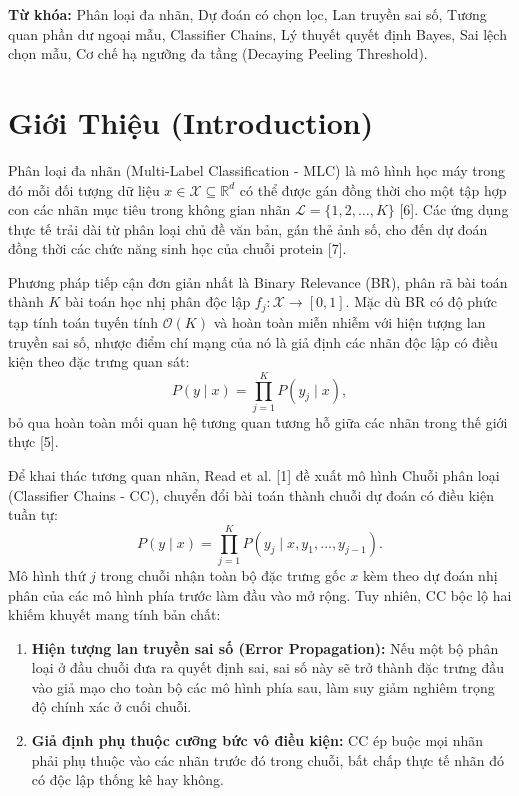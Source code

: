 \documentclass[10pt,a4paper,twoside]{article}
\begin{document}
\vspace{0.5em}
\noindent\textbf{Từ khóa:} Phân loại đa nhãn, Dự đoán có chọn lọc, Lan truyền sai số, Tương quan phần dư ngoại mẫu, Classifier Chains, Lý thuyết quyết định Bayes, Sai lệch chọn mẫu, Cơ chế hạ ngưỡng đa tầng (Decaying Peeling Threshold).

\section{Giới Thiệu (Introduction)}
Phân loại đa nhãn (Multi-Label Classification - MLC) là mô hình học máy trong đó mỗi đối tượng dữ liệu $x \in \mathcal{X} \subseteq \mathbb{R}^d$ có thể được gán đồng thời cho một tập hợp con các nhãn mục tiêu trong không gian nhãn $\mathcal{L} = \{1, 2, \dots, K\}$ [6]. Các ứng dụng thực tế trải dài từ phân loại chủ đề văn bản, gán thẻ ảnh số, cho đến dự đoán đồng thời các chức năng sinh học của chuỗi protein [7].

Phương pháp tiếp cận đơn giản nhất là Binary Relevance (BR), phân rã bài toán thành $K$ bài toán học nhị phân độc lập $f_j: \mathcal{X} \to [0, 1]$. Mặc dù BR có độ phức tạp tính toán tuyến tính $\mathcal{O}(K)$ và hoàn toàn miễn nhiễm với hiện tượng lan truyền sai số, nhược điểm chí mạng của nó là giả định các nhãn độc lập có điều kiện theo đặc trưng quan sát:
\begin{equation}
P(y \mid x) = \prod_{j=1}^K P(y_j \mid x),
\end{equation}
bỏ qua hoàn toàn mối quan hệ tương quan tương hỗ giữa các nhãn trong thế giới thực [5].

Để khai thác tương quan nhãn, Read et al. [1] đề xuất mô hình Chuỗi phân loại (Classifier Chains - CC), chuyển đổi bài toán thành chuỗi dự đoán có điều kiện tuần tự:
\begin{equation}
P(y \mid x) = \prod_{j=1}^K P(y_j \mid x, y_1, \dots, y_{j-1}).
\end{equation}
Mô hình thứ $j$ trong chuỗi nhận toàn bộ đặc trưng gốc $x$ kèm theo dự đoán nhị phân của các mô hình phía trước làm đầu vào mở rộng. Tuy nhiên, CC bộc lộ hai khiếm khuyết mang tính bản chất:
\begin{enumerate}[leftmargin=*]
    \item \textbf{Hiện tượng lan truyền sai số (Error Propagation):} Nếu một bộ phân loại ở đầu chuỗi đưa ra quyết định sai, sai số này sẽ trở thành đặc trưng đầu vào giả mạo cho toàn bộ các mô hình phía sau, làm suy giảm nghiêm trọng độ chính xác ở cuối chuỗi.
    \item \textbf{Giả định phụ thuộc cưỡng bức vô điều kiện:} CC ép buộc mọi nhãn phải phụ thuộc vào các nhãn trước đó trong chuỗi, bất chấp thực tế nhãn đó có độc lập thống kê hay không.
\end{enumerate}
\end{document}
